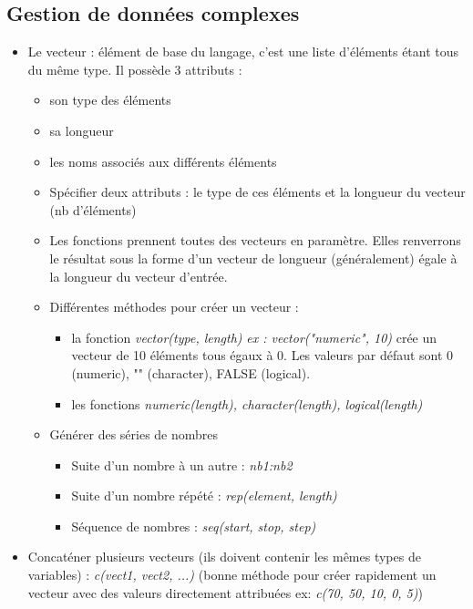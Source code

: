 \documentclass[12pt,a4paper]{article}
\begin{document}
\subsection{Gestion de données complexes}
\begin{itemize}
\item Le vecteur : élément de base du langage, c'est une liste d'éléments étant tous du même type. Il possède 3 attributs : 
\begin{itemize}
\item son type des éléments
\item sa longueur
\item les noms associés aux différents éléments
\end{itemize}
\begin{itemize}
\item Spécifier deux attributs : le type de ces éléments et la longueur du vecteur (nb d'éléments)
\item Les fonctions prennent toutes des vecteurs en paramètre. Elles renverrons le résultat sous la forme d'un vecteur de longueur (généralement) égale à la longueur du vecteur d'entrée.
\item Différentes méthodes pour créer un vecteur :
\begin{itemize}
\item la fonction \textit{vector(type, length)} 
\newline \textit{ex : vector("numeric", 10)} crée un vecteur de 10 éléments tous égaux à 0.
\newline Les valeurs par défaut sont 0 (numeric), "" (character), FALSE (logical).
\item les fonctions \textit{numeric(length), character(length), logical(length)}
\end{itemize}
\item Générer des séries de nombres
\begin{itemize}
\item Suite d'un nombre à un autre : \textit{nb1:nb2}
\item Suite d'un nombre répété : \textit{rep(element, length)}
\item Séquence de nombres : \textit{seq(start, stop, step)}
\end{itemize}
\end{itemize}
\item Concaténer plusieurs vecteurs (ils doivent contenir les mêmes types de variables) : 
\newline \textit{c(vect1, vect2, ...)} (bonne méthode pour créer rapidement un vecteur avec des valeurs directement attribuées ex: \textit{c(70, 50, 10, 0, 5)})

\end{itemize}
\end{document}
